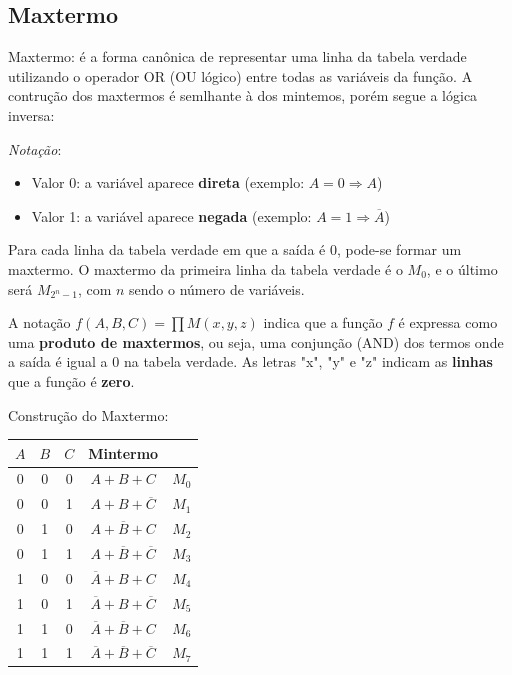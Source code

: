 \documentclass[12pt]{article}
\begin{document}
\subsection{Maxtermo}
Maxtermo: é a forma canônica de representar uma linha da tabela verdade utilizando o operador OR (OU lógico) entre todas as variáveis da função. 
A contrução dos maxtermos é semlhante à dos mintemos, porém segue a lógica inversa:

\textit{Notação}:
\begin{itemize}
   \item Valor 0: a variável aparece \textbf{direta} (exemplo: $A = 0 \Rightarrow A$)
   \item Valor 1: a variável aparece \textbf{negada} (exemplo: $A = 1 \Rightarrow \overline{A}$)
\end{itemize}

Para cada linha da tabela verdade em que a saída é 0, pode-se formar um maxtermo. O maxtermo da primeira linha da tabela verdade é o $M_0$, e o último será $M_{2^n - 1}$, com $n$ sendo o número de variáveis.

\begin{tcolorbox}[mynote, title=Notação – Forma Canônica por Maxtermos]
A notação \textit{$f(A, B, C) = \prod M(x, y, z)$} indica que a função $f$ é expressa como uma \textbf{produto de maxtermos}, ou seja, uma conjunção (AND) dos termos onde a saída é igual a 0 na tabela verdade. As letras "x", "y" e "z" indicam as \textbf{linhas} que a função é \textbf{zero}.
\end{tcolorbox} 

\vspace{0.5cm}
Construção do Maxtermo:
\begin{center}
\begin{tabular}{|c|c|c|c|c|}
\hline
$A$ & $B$ & $C$ & Mintermo &\\
\hline
0 & 0 & 0 & $A + B + C$ & $M_0$ \\
0 & 0 & 1 & $A + B + \overline{C}$ & $M_1$ \\
0 & 1 & 0 & $A + \overline{B} + C$ & $M_2$ \\
0 & 1 & 1 & $A + \overline{B} + \overline{C}$ & $M_3$ \\
1 & 0 & 0 & $\overline{A} + B + C$ & $M_4$ \\
1 & 0 & 1 & $\overline{A} + B + \overline{C}$ & $M_5$ \\
1 & 1 & 0 & $\overline{A} + \overline{B} + C$ & $M_6$ \\
1 & 1 & 1 & $\overline{A} + \overline{B} + \overline{C}$ & $M_7$ \\
\hline
\end{tabular}
\vspace{0.5cm}
\end{center}
\end{document}
